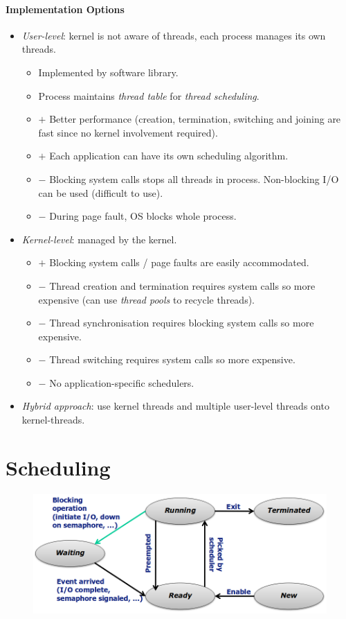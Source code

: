 \documentclass[twocolumn,english]{article}
\begin{document}
\paragraph{Implementation Options}
\begin{itemize}
\item \emph{User-level}: kernel is not aware of threads, each process manages
its own threads.
\begin{itemize}
\item Implemented by software library.
\item Process maintains \emph{thread table} for \emph{thread scheduling}.
\item $+$ Better performance (creation, termination, switching and joining
are fast since no kernel involvement required).
\item $+$ Each application can have its own scheduling algorithm.
\item $-$ Blocking system calls stops all threads in process. Non-blocking
I/O can be used (difficult to use).
\item $-$ During page fault, OS blocks whole process.
\end{itemize}
\item \emph{Kernel-level}: managed by the kernel.
\begin{itemize}
\item $+$ Blocking system calls / page faults are easily accommodated.
\item $-$ Thread creation and termination requires system calls so more
expensive (can use \emph{thread pools} to recycle threads).
\item $-$ Thread synchronisation requires blocking system calls so more
expensive.
\item $-$ Thread switching requires system calls so more expensive.
\item $-$ No application-specific schedulers.
\end{itemize}
\item \emph{Hybrid approach}: use kernel threads and multiple user-level
threads onto kernel-threads.
\end{itemize}

\section{Scheduling}

\begin{figure}[H]
\centering{}\includegraphics[width=0.75\linewidth]{img/process-states}
\end{figure}
\end{document}
